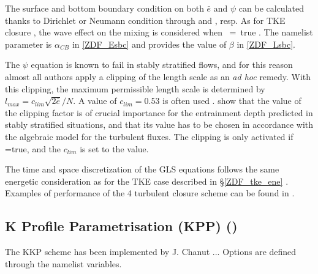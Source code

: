 The surface and bottom boundary condition on both $\bar{e}$ and $\psi$ can be calculated 
thanks to Dirichlet or Neumann condition through  and , resp. 
As for TKE closure , the wave effect on the mixing is considered when ~=~true
\citep{Craig_Banner_JPO94, Mellor_Blumberg_JPO04}. The  namelist parameter 
is $\alpha_{CB}$ in \eqref{ZDF_Esbc} and  provides the value of $\beta$ in \eqref{ZDF_Lsbc}. 

The $\psi$ equation is known to fail in stably stratified flows, and for this reason 
almost all authors apply a clipping of the length scale as an \textit{ad hoc} remedy. 
With this clipping, the maximum permissible length scale is determined by 
$l_{max} = c_{lim} \sqrt{2\bar{e}}/ N$. A value of $c_{lim} = 0.53$ is often used 
\citep{Galperin_al_JAS88}. \cite{Umlauf_Burchard_CSR05} show that the value of 
the clipping factor is of crucial importance for the entrainment depth predicted in 
stably stratified situations, and that its value has to be chosen in accordance 
with the algebraic model for the turbulent fluxes. The clipping is only activated 
if =true, and the $c_{lim}$ is set to the  value.

The time and space discretization of the GLS equations follows the same energetic 
consideration as for the TKE case described in \S\ref{ZDF_tke_ene}  \citep{Burchard_OM02}. 
Examples of performance of the 4 turbulent closure scheme can be found in \citet{Warner_al_OM05}.

\subsection{K Profile Parametrisation (KPP) () }
\label{ZDF_kpp}


The KKP scheme has been implemented by J. Chanut ...
Options are defined through the   namelist variables.


